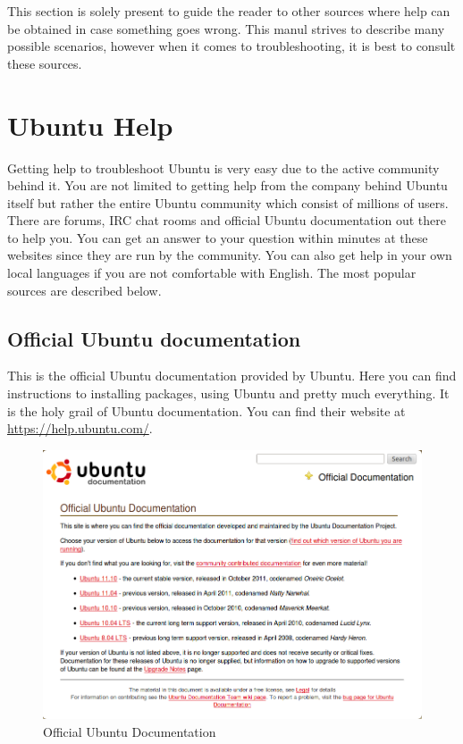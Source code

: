 This section is solely present to guide the reader to other sources where help can be obtained in case something goes wrong. This manul strives to describe many possible scenarios, however when it comes to troubleshooting, it is best to consult these sources. 

\section{Ubuntu Help}
Getting help to troubleshoot Ubuntu is very easy due to the active community behind it. You are not limited to getting help from the company behind Ubuntu itself but rather the entire Ubuntu community which consist of millions of users. There are forums, IRC chat rooms and official Ubuntu documentation out there to help you. You can get an answer to your  question within minutes at these websites since they are run by the community. You can also get help in your own local languages if you are not comfortable with English. The most popular sources are described below.

\subsection*{Official Ubuntu documentation}
This is the official Ubuntu documentation provided by Ubuntu. Here you can find instructions to installing packages, using Ubuntu and pretty much everything. It is the holy grail of Ubuntu documentation. You can find their website at \href{https://help.ubuntu.com/}{https://help.ubuntu.com/}.

\begin{figure}[h!]	
	\centering
	\includegraphics[width=350pt]{./images/get-help/officialubuntuhelp.png}
	\caption{Official Ubuntu Documentation}	
	\label{fig:official-ubuntu-help}		
\end{figure}

